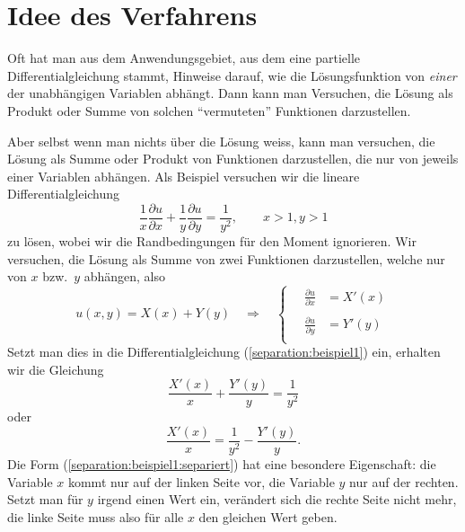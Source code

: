 %
%
%

\section{Idee des Verfahrens}
Oft hat man aus dem Anwendungsgebiet, aus dem eine partielle
Differentialgleichung stammt, Hinweise darauf, wie die Lösungsfunktion
von {\em einer} der unabhängigen Variablen abhängt.
Dann kann man Versuchen, die Lösung als Produkt oder Summe von
solchen ``vermuteten'' Funktionen darzustellen.

Aber selbst wenn man nichts über die Lösung weiss, kann man 
versuchen, die Lösung als Summe oder Produkt von Funktionen darzustellen,
die nur von jeweils einer Variablen abhängen. Als Beispiel versuchen
wir die lineare Differentialgleichung 
\begin{equation}
\frac1x
\frac{\partial u}{\partial x}
+
\frac1y
\frac{\partial u}{\partial y}
=\frac1{y^2}
,
\qquad x>1, y>1
\label{separation:beispiel1}
\end{equation}
zu lösen, wobei wir die Randbedingungen für den Moment ignorieren.
Wir versuchen, die Lösung als Summe von zwei Funktionen darzustellen,
welche nur von $x$ bzw.~$y$ abhängen, also
\begin{equation}
u(x,y)=X(x)+Y(y)
\quad\Rightarrow\quad
\begin{cases}
\quad{\displaystyle \frac{\partial u}{\partial x}}&=X'(x)\\
\\
\quad{\displaystyle \frac{\partial u}{\partial y}}&=Y'(y)\\
\end{cases}
\label{separation:beispiel1:ansatz}
\end{equation}
Setzt man dies in die Differentialgleichung (\ref{separation:beispiel1})
ein, erhalten wir die Gleichung
\[
\frac{X'(x)}{x}+\frac{Y'(y)}{y}=\frac1{y^2}
\]
oder
\begin{equation}
\frac{X'(x)}{x}
=\frac1{y^2}
-\frac{Y'(y)}{y}.
\label{separation:beispiel1:separiert}
\end{equation}
Die Form (\ref{separation:beispiel1:separiert}) hat eine besondere
Eigenschaft: die Variable $x$ kommt nur auf der linken Seite vor,
die Variable $y$ nur auf der rechten. Setzt man für $y$ irgend
einen Wert ein, verändert sich die rechte Seite nicht mehr,
die linke Seite muss also für alle $x$ den gleichen Wert geben.

